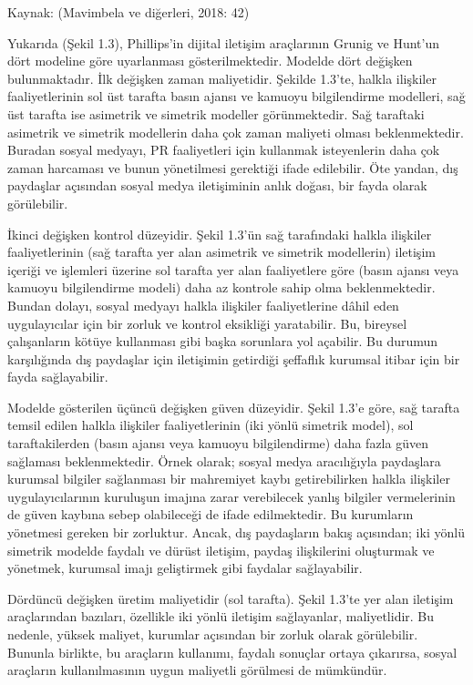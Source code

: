 \documentclass[
]{book}
\begin{document}
Kaynak: (Mavimbela ve diğerleri, 2018: 42)

Yukarıda (Şekil 1.3), Phillips'in dijital iletişim araçlarının Grunig ve Hunt'un dört modeline göre uyarlanması gösterilmektedir. Modelde dört değişken bulunmaktadır. İlk değişken zaman maliyetidir. Şekilde 1.3'te, halkla ilişkiler faaliyetlerinin sol üst tarafta basın ajansı ve kamuoyu bilgilendirme modelleri, sağ üst tarafta ise asimetrik ve simetrik modeller görünmektedir. Sağ taraftaki asimetrik ve simetrik modellerin daha çok zaman maliyeti olması beklenmektedir. Buradan sosyal medyayı, PR faaliyetleri için kullanmak isteyenlerin daha çok zaman harcaması ve bunun yönetilmesi gerektiği ifade edilebilir. Öte yandan, dış paydaşlar açısından sosyal medya iletişiminin anlık doğası, bir fayda olarak görülebilir.

İkinci değişken kontrol düzeyidir. Şekil 1.3'ün sağ tarafındaki halkla ilişkiler faaliyetlerinin (sağ tarafta yer alan asimetrik ve simetrik modellerin) iletişim içeriği ve işlemleri üzerine sol tarafta yer alan faaliyetlere göre (basın ajansı veya kamuoyu bilgilendirme modeli) daha az kontrole sahip olma beklenmektedir. Bundan dolayı, sosyal medyayı halkla ilişkiler faaliyetlerine dâhil eden uygulayıcılar için bir zorluk ve kontrol eksikliği yaratabilir. Bu, bireysel çalışanların kötüye kullanması gibi başka sorunlara yol açabilir. Bu durumun karşılığında dış paydaşlar için iletişimin getirdiği şeffaflık kurumsal itibar için bir fayda sağlayabilir.

Modelde gösterilen üçüncü değişken güven düzeyidir. Şekil 1.3'e göre, sağ tarafta temsil edilen halkla ilişkiler faaliyetlerinin (iki yönlü simetrik model), sol taraftakilerden (basın ajansı veya kamuoyu bilgilendirme) daha fazla güven sağlaması beklenmektedir. Örnek olarak; sosyal medya aracılığıyla paydaşlara kurumsal bilgiler sağlanması bir mahremiyet kaybı getirebilirken halkla ilişkiler uygulayıcılarının kuruluşun imajına zarar verebilecek yanlış bilgiler vermelerinin de güven kaybına sebep olabileceği de ifade edilmektedir. Bu kurumların yönetmesi gereken bir zorluktur. Ancak, dış paydaşların bakış açısından; iki yönlü simetrik modelde faydalı ve dürüst iletişim, paydaş ilişkilerini oluşturmak ve yönetmek, kurumsal imajı geliştirmek gibi faydalar sağlayabilir.

Dördüncü değişken üretim maliyetidir (sol tarafta). Şekil 1.3'te yer alan iletişim araçlarından bazıları, özellikle iki yönlü iletişim sağlayanlar, maliyetlidir. Bu nedenle, yüksek maliyet, kurumlar açısından bir zorluk olarak görülebilir. Bununla birlikte, bu araçların kullanımı, faydalı sonuçlar ortaya çıkarırsa, sosyal araçların kullanılmasının uygun maliyetli görülmesi de mümkündür.
\end{document}
